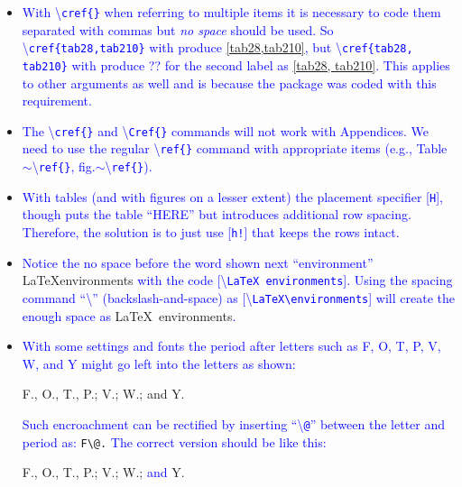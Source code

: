 \documentclass[phd]{ndsu-thesis-2022}
\newcommand\italk[1]{\textcolor{blue}{#1}}  %
\newcommand\cmd[1]{\textbackslash\texttt{#1}}  %
\begin{document}
\begin{itemize}
\item
\italk{With \cmd{cref\{\}} when referring to multiple items it is necessary to code them separated with commas but \emph{no space} should be used. So \cmd{cref\{tab28,tab210\}} with produce} \cref{tab28,tab210}\italk{, but \cmd{cref\{tab28, tab210\}} with produce ?? for the second label as } \cref{tab28, tab210}\italk{. This applies to other arguments as well and is because the package was coded with this requirement.}

\item
\italk{The \cmd{cref\{\}} and \cmd{Cref\{\}} commands will not work with Appendices. We need to use the regular \cmd{ref\{\}} command with appropriate items (e.g., Table$\sim$\cmd{ref\{\}}, fig.$\sim$\cmd{ref\{\}}).}

\item
\italk{With tables (and with figures on a lesser extent) the placement specifier [\texttt{H}], though puts the table ``HERE'' but introduces additional row spacing. Therefore, the solution is to just use [\texttt{h!}] that keeps the rows intact.}

\item
\italk{Notice the no space before the word shown next ``environment''}  \LaTeX environments \italk{with the code [\cmd{LaTeX environments}]. Using the spacing command ``\cmd{\:}'' (backslash-and-space) as [\cmd{LaTeX\textbackslash\:environments}] will create the enough space as} \LaTeX\ environments\italk{.}

\item
\italk{With some settings and fonts the period after letters such as F, O, T, P, V, W, and Y might go left into the letters as shown:}

{\selectfont 
{\LARGE F., O., T., P.; V.; W.;} and {\LARGE Y.}}

\italk{Such encroachment can be rectified by inserting ``\cmd{@}'' between the letter and period as:} {\LARGE{\verb|F\@.|}} \italk{The correct version should be like this:} 
 
{\selectfont\LARGE F\@., O\@., T\@., P\@.; V\@.; W\@.;} \italk{and} {\selectfont\LARGE Y\@.}


\end{itemize}


\end{document}
